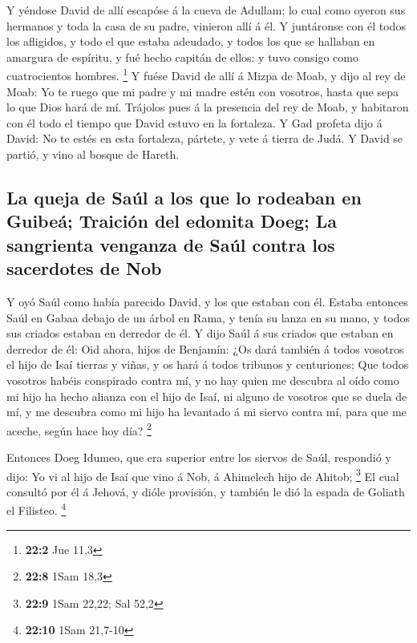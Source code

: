  Y yéndose David de allí escapóse á la cueva de Adullam; lo
cual como oyeron sus hermanos y toda la casa de su padre, vinieron allí
á él.  Y juntáronse con él todos los afligidos, y todo el
que estaba adeudado, y todos los que se hallaban en amargura de
espíritu, y fué hecho capitán de ellos: y tuvo consigo como
cuatrocientos hombres. \footnote{\textbf{22:2} Jue 11,3}  Y
fuése David de allí á Mizpa de Moab, y dijo al rey de Moab: Yo te ruego
que mi padre y mi madre estén con vosotros, hasta que sepa lo que Dios
hará de mí.  Trájolos pues á la presencia del rey de Moab, y
habitaron con él todo el tiempo que David estuvo en la fortaleza.
 Y Gad profeta dijo á David: No te estés en esta fortaleza,
pártete, y vete á tierra de Judá. Y David se partió, y vino al bosque de
Hareth.

\hypertarget{la-queja-de-sauxfal-a-los-que-lo-rodeaban-en-guibeuxe1-traiciuxf3n-del-edomita-doeg-la-sangrienta-venganza-de-sauxfal-contra-los-sacerdotes-de-nob}{%
\subsection{La queja de Saúl a los que lo rodeaban en Guibeá; Traición
del edomita Doeg; La sangrienta venganza de Saúl contra los sacerdotes
de
Nob}\label{la-queja-de-sauxfal-a-los-que-lo-rodeaban-en-guibeuxe1-traiciuxf3n-del-edomita-doeg-la-sangrienta-venganza-de-sauxfal-contra-los-sacerdotes-de-nob}}

 Y oyó Saúl como había parecido David, y los que estaban con
él. Estaba entonces Saúl en Gabaa debajo de un árbol en Rama, y tenía su
lanza en su mano, y todos sus criados estaban en derredor de él.
 Y dijo Saúl á sus criados que estaban en derredor de él:
Oid ahora, hijos de Benjamín: ¿Os dará también á todos vosotros el hijo
de Isaí tierras y viñas, y os hará á todos tribunos y centuriones;
 Que todos vosotros habéis conspirado contra mí, y no hay
quien me descubra al oído como mi hijo ha hecho alianza con el hijo de
Isaí, ni alguno de vosotros que se duela de mí, y me descubra como mi
hijo ha levantado á mi siervo contra mí, para que me aceche, según hace
hoy día? \footnote{\textbf{22:8} 1Sam 18,3}

 Entonces Doeg Idumeo, que era superior entre los siervos de
Saúl, respondió y dijo: Yo vi al hijo de Isaí que vino á Nob, á
Ahimelech hijo de Ahitob; \footnote{\textbf{22:9} 1Sam 22,22; Sal 52,2}
 El cual consultó por él á Jehová, y dióle provisión, y
también le dió la espada de Goliath el Filisteo. \footnote{\textbf{22:10}
  1Sam 21,7-10}

